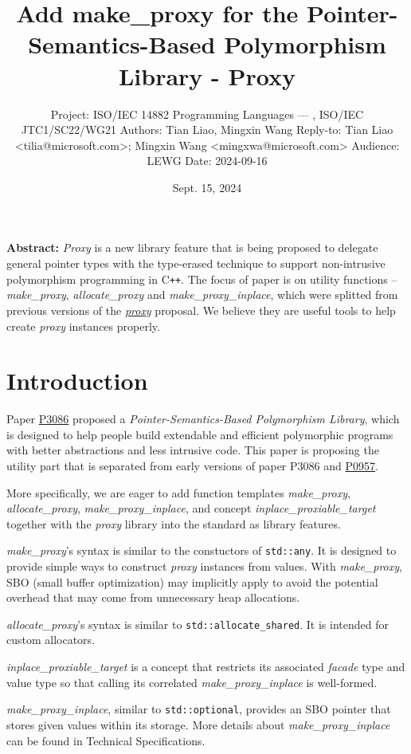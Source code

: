 \documentclass[10pt, a4paper, oneside]{article}
\title{Add make\_proxy for the Pointer-Semantics-Based
Polymorphism Library - Proxy}
\date{Sept. 15, 2024}
\author{%
\medbreak
Project: ISO/IEC 14882 Programming Languages — \Cpp{}, ISO/IEC JTC1/SC22/WG21\smallbreak
Authors: Tian Liao, Mingxin Wang\smallbreak
Reply-to: Tian Liao \textless tilia@microsoft.com\textgreater; Mingxin Wang \textless mingxwa@microsoft.com\textgreater \smallbreak
Audience: LEWG\smallbreak
Date: 2024-09-16
}
\makeatletter
\newcommand{\Cpp}{C\texttt{++}}
\renewcommand{\maketitle}{\bgroup\setlength{\parindent}{0pt}
\begin{flushleft}
  \textbf{\huge \@title}

  \@author
\end{flushleft}\egroup
}
\makeatother
\begin{document}
\maketitle

\textbf{Abstract:} \textit{Proxy} is a new library feature that is being proposed to delegate general pointer types
with the type-erased technique to support non-intrusive polymorphism programming in \Cpp.
The focus of paper is on utility functions -- \textit{make\_proxy}, \textit{allocate\_proxy} and \textit{make\_proxy\_inplace},
which were splitted from previous versions of the \href{https://wg21.link/p3086r1}{\textit{proxy}} proposal.
We believe they are useful tools to help create \textit{proxy} instances properly.

\section{Introduction}

Paper \href{https://wg21.link/p3086}{P3086} proposed a \textit{Pointer-Semantics-Based Polymorphism Library},
which is designed to help people build extendable and efficient polymorphic programs with better abstractions and less intrusive code.
This paper is proposing the utility part that is separated from early versions of paper P3086 and \href{https://wg21.link/p0957}{P0957}.

More specifically, we are eager to add function templates \textit{make\_proxy}, \textit{allocate\_proxy}, \textit{make\_proxy\_inplace},
and concept \textit{inplace\_proxiable\_target} together with the \textit{proxy} library into the standard as library features.

\textit{make\_proxy}'s syntax is similar to the constuctors of \verb|std::any|.
It is designed to provide simple ways to construct \textit{proxy} instances from values.
With \textit{make\_proxy}, SBO (small buffer optimization) may implicitly apply to avoid the potential overhead that may come from unnecessary heap allocations.

\textit{allocate\_proxy}'s syntax is similar to \verb|std::allocate_shared|. It is intended for custom allocators.

\textit{inplace\_proxiable\_target} is a concept that restricts its associated \textit{facade} type and value type
so that calling its correlated \textit{make\_proxy\_inplace} is well-formed.

\textit{make\_proxy\_inplace}, similar to \verb|std::optional|,
provides an SBO pointer that stores given values within its storage.
More details about \textit{make\_proxy\_inplace} can be found in Technical Specifications.
\end{document}
